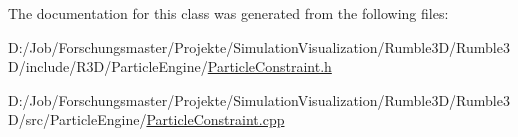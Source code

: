 The documentation for this class was generated from the following files\+:\begin{DoxyCompactItemize}
\item 
D\+:/\+Job/\+Forschungsmaster/\+Projekte/\+Simulation\+Visualization/\+Rumble3\+D/\+Rumble3\+D/include/\+R3\+D/\+Particle\+Engine/\mbox{\hyperlink{_particle_constraint_8h}{Particle\+Constraint.\+h}}\item 
D\+:/\+Job/\+Forschungsmaster/\+Projekte/\+Simulation\+Visualization/\+Rumble3\+D/\+Rumble3\+D/src/\+Particle\+Engine/\mbox{\hyperlink{_particle_constraint_8cpp}{Particle\+Constraint.\+cpp}}\end{DoxyCompactItemize}
